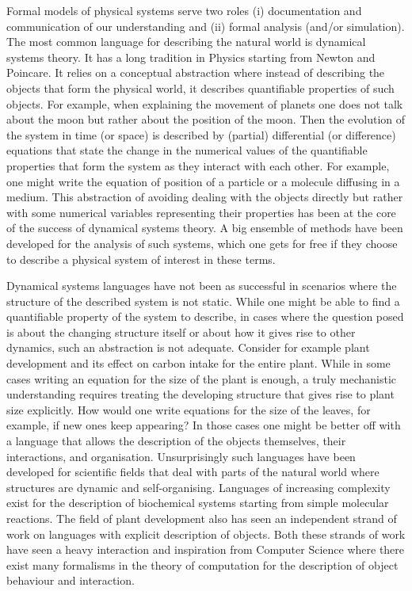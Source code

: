Formal models of physical systems serve two roles (i) documentation and
communication of our understanding and (ii) formal analysis (and/or simulation). The
most common language for describing the natural world is dynamical systems
theory. It has a long tradition in Physics starting from Newton and Poincare. It
relies on a conceptual abstraction where instead of describing the objects that
form the physical world, it describes quantifiable properties of such
objects. For example, when explaining the movement of planets one does not talk
about the moon but rather about the position of the moon. Then the evolution of
the system in time (or space) is described by (partial) differential (or
difference) equations that state the change in the numerical values of the
quantifiable properties that form the system as they interact with each
other. For example, one might write the equation of position of a particle or a
molecule diffusing in a medium. This abstraction of avoiding dealing with the
objects directly but rather with some numerical variables representing their
properties has been at the core of the success of dynamical systems theory. A
big ensemble of methods have been developed for the analysis of such systems,
which one gets for free if they choose to describe a physical system of interest
in these terms.

Dynamical systems languages have not been as successful in scenarios where the
structure of the described system is not static. While one might be able to find
a quantifiable property of the system to describe, in cases where the question
posed is about the changing structure itself or about how it gives rise to other
dynamics, such an abstraction is not adequate. Consider for example plant
development and its effect on carbon intake for the entire plant. While in some
cases writing an equation for the size of the plant is enough, a truly
mechanistic understanding requires treating the developing structure that gives
rise to plant size explicitly. How would one write equations for the size of the
leaves, for example, if new ones keep appearing?  In those cases one might be
better off with a language that allows the description of the objects
themselves, their interactions, and organisation. Unsurprisingly such languages
have been developed for scientific fields that deal with parts of the natural
world where structures are dynamic and self-organising. Languages of increasing
complexity exist for the description of biochemical systems starting from simple
molecular reactions. The field of plant development also has seen an independent
strand of work on languages with explicit description of objects. Both these
strands of work have seen a heavy interaction and inspiration from Computer
Science where there exist many formalisms in the theory of computation for the
description of object behaviour and interaction.

